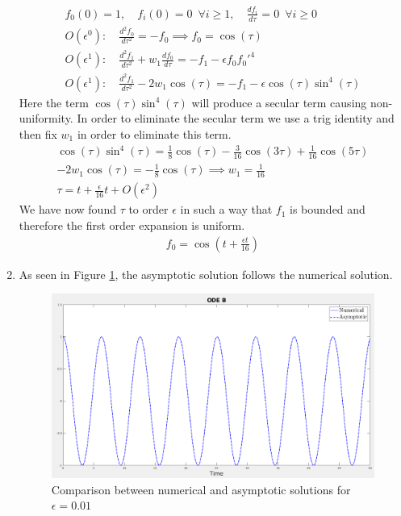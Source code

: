 \documentclass{article}
\begin{document}
\begin{enumerate}[label=\alph*.]
\begin{gather*}
        f_0(0) = 1, \quad f_i(0) = 0 \enspace \forall i \ge 1,\quad
        \frac{df_i}{d\tau} = 0 \enspace \forall i
        \ge 0\\
        O(\epsilon^0): \quad \frac{d^2f_0}{d\tau^2} = -f_0 \implies f_0 =
        \cos(\tau)\\
        O(\epsilon^1): \quad \frac{d^2f_1}{d\tau^2} + w_1\frac{df_0}{d\tau}=
        -f_1 - \epsilon f_0f_0'^4 \\
        O(\epsilon^1): \quad \frac{d^2f_1}{d\tau^2} - 2w_1\cos(\tau) =
        -f_1 - \epsilon \cos(\tau)\sin^4(\tau)
    \end{gather*}
    Here the term $\cos(\tau)\sin^4(\tau)$ will produce a secular term causing
    non-uniformity. In order to eliminate the secular term we use a trig
    identity and then fix $w_1$ in order to eliminate this term. 
    \begin{gather*}
        \cos(\tau)\sin^4(\tau) = \frac{1}{8}\cos(\tau) - \frac{3}{16}\cos(3\tau) +
        \frac{1}{16}\cos(5\tau)\\
        -2w_1\cos(\tau) = -\frac{1}{8}\cos(\tau) \implies w_1 = \frac{1}{16}\\
        \tau = t + \frac{\epsilon}{16}t + O(\epsilon^2)
    \end{gather*}
    We have now found $\tau$ to order $\epsilon$ in such a way that $f_1$ is
    bounded and therefore the first order expansion is uniform. 
    \begin{gather*}
        f_0 = \cos\left(t + \frac{\epsilon t}{16}\right)
    \end{gather*} 
    \item As seen in Figure \ref{fig:ODEB_comp}, the asymptotic solution follows
    the numerical solution. 
        \begin{figure}
            \centering
            \includegraphics[width=.8\textwidth]{images/ODEB_sol.png}
            \caption{Comparison between numerical and asymptotic solutions for
            $\epsilon = 0.01$}
            \label{fig:ODEB_comp}
        \end{figure}

\end{enumerate}
\end{document}

